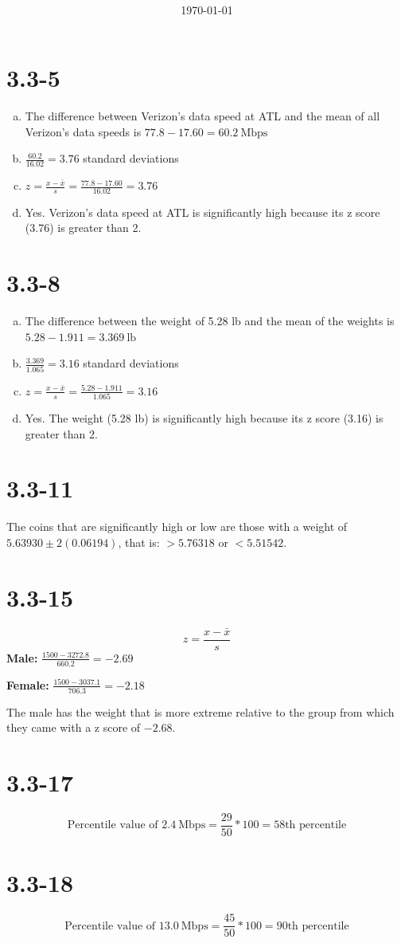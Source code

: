 \documentclass[12pt,fleqn]{article}
\title{\classdescription\ \\ \classname\ \\ $\ $ \\ \assignment}
\author{\authorname}
\date{\today}
\newcommand{\chapter}{3.3}
\newcommand{\problem}[1]{\vspace{5ex}\section*{\chapter-#1}}
\begin{document}
\maketitle

\problem{5}
\begin{enumerate}[(a)]
  \item The difference between Verizon's data speed at ATL and the mean of all Verizon's data speeds is $77.8 - 17.60 = 60.2~\text{Mbps}$
  \item $\frac{60.2}{16.02} = 3.76$ standard deviations
  \item $z = \frac{x - \bar{x}}{s} = \frac{77.8 - 17.60}{16.02} = 3.76$
  \item Yes. Verizon's data speed at ATL is significantly high because its z score (3.76) is greater than 2.
\end{enumerate}

\problem{8}
\begin{enumerate}[(a)]
  \item The difference between the weight of 5.28 lb and the mean of the weights is $5.28 - 1.911 = 3.369~\text{lb}$
  \item $\frac{3.369}{1.065} = 3.16$ standard deviations
  \item $z = \frac{x - \bar{x}}{s} = \frac{5.28 - 1.911}{1.065} = 3.16$
  \item Yes. The weight (5.28 lb) is significantly high because its z score (3.16) is greater than 2.
\end{enumerate}


\problem{11}
The coins that are significantly high or low are those with a weight of $5.63930 \pm 2(0.06194)$, that is: $> 5.76318$ or $< 5.51542$.


\problem{15}
\begin{equation*}
  z = \frac{x - \bar{x}}{s}
\end{equation*}
\textbf{Male:} $\frac{1500 - 3272.8}{660.2} = -2.69$

\textbf{Female:} $\frac{1500 - 3037.1}{706.3} = -2.18$

The male has the weight that is more extreme relative to the group from which they came with a z score of $-2.68$.


\problem{17}
\begin{equation*}
  \text{Percentile value of } 2.4~\text{Mbps} = \frac{29}{50} * 100 = 58 \text{th percentile}
\end{equation*}


\problem{18}
\begin{equation*}
  \text{Percentile value of } 13.0~\text{Mbps} = \frac{45}{50} * 100 = 90 \text{th percentile}
\end{equation*}
\end{document}
